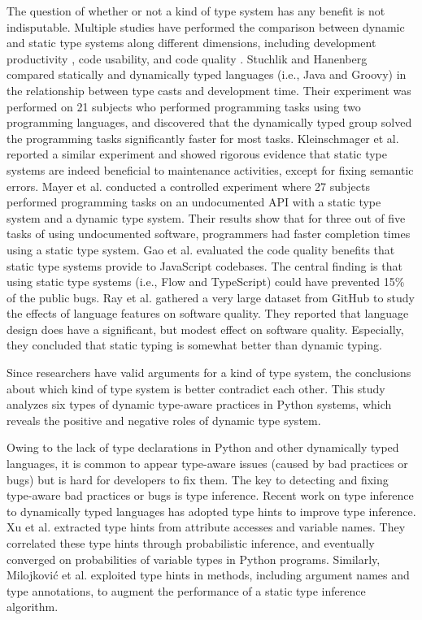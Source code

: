 The question of whether or not a kind of type system has any benefit is not indisputable. Multiple studies have performed the comparison between dynamic and static type systems along different dimensions, including development productivity \cite{b21,b25} , code usability\cite{b26}, and code quality \cite{b10,b28}.
Stuchlik and Hanenberg \cite{b21} compared statically and dynamically typed languages (i.e., Java and Groovy) in the relationship between type casts and development time. Their experiment was performed on 21 subjects who performed programming tasks using two programming languages, and discovered that the dynamically typed group solved the programming tasks significantly faster for most tasks.
Kleinschmager et al. \cite{b25} reported a similar experiment and showed rigorous evidence that static type systems are indeed beneficial to maintenance activities, except for fixing semantic errors.		
Mayer et al. \cite{b26} conducted a controlled experiment where 27 subjects performed programming tasks on an undocumented API with a static type system and a dynamic type system. Their results show that for three out of five tasks of using undocumented software, programmers had faster completion times using a static type system.
Gao et al. \cite{b10} evaluated the code quality benefits that static type systems provide to JavaScript codebases. The central finding is that using static type systems (i.e., Flow and TypeScript) could have prevented 15\% of the public bugs.
Ray et al. \cite{b28} gathered a very large dataset from GitHub to study the effects of language features on software quality. They reported that language design does have a significant, but modest effect on software quality. Especially, they concluded that static typing is somewhat better than dynamic typing.
		
Since researchers have valid arguments for a kind of type system, the conclusions about which kind of type system is better contradict each other. This study analyzes six types of dynamic type-aware practices in Python systems, which reveals the positive and negative roles of dynamic type system.
		
		
Owing to the lack of type declarations in Python and other dynamically typed languages, it is common to appear type-aware issues (caused by bad practices or bugs) but is hard for developers to fix them. The key to detecting and fixing type-aware bad practices or bugs is type inference. Recent work on type inference to dynamically typed languages has adopted type hints to improve type inference. Xu et al. \cite{b14} extracted type hints from attribute accesses and variable names. They correlated these type hints through probabilistic inference, and eventually converged on probabilities of variable types in Python programs. Similarly, Milojkovi{\'c} et al. \cite{b20} exploited type hints in methods, including argument names and type annotations, to augment the performance of a static type inference algorithm.

